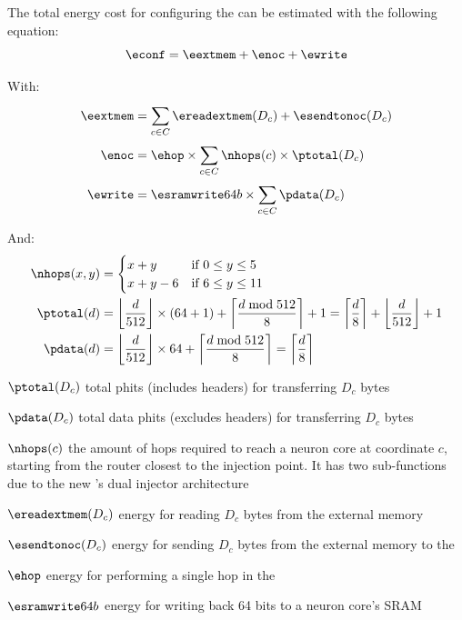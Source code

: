 The total energy cost for configuring the \graicore{} can be estimated with the following equation:
\begin{equation}
    \econf = \eextmem + \enoc + \ewrite
\end{equation}

With:
\begin{align*} 
\eextmem &= 
        \sum_{c \in C}^{}{\ereadextmem(D_c) + \esendtonoc(D_c)} \\
\enoc &=
    \ehop \times \sum_{c \in C}^{}{\nhops(c) \times \ptotal(D_c)} \\
\ewrite &=
    \esramwrite64b \times \sum_{c \in C}^{}{\pdata(D_c)}
\end{align*}

And:
\begin{align*} 
\nhops(x,y) &=
    \begin{cases} 
        x + y & \textrm{if } 0 \leq y \leq 5 \\
        x + y - 6 & \text{if } 6 \leq y \leq 11
    \end{cases}
\\
\ptotal(d) &=
    \left\lfloor \frac{d}{512} \right\rfloor \times (64 + 1) + \left\lceil \frac{d \bmod 512}{8} \right\rceil + 1 =
    \left\lceil \frac{d}{8} \right\rceil + \left\lfloor \frac{d}{512} \right\rfloor + 1 
\\
\pdata(d) &=
    \left\lfloor \frac{d}{512} \right\rfloor \times 64 + \left\lceil \frac{d \bmod 512}{8} \right\rceil =
    \left\lceil \frac{d}{8} \right\rceil
\end{align*}

\begin{eqexpl}[15mm]
    \item{$\ptotal(D_c)$} total phits (includes headers) for transferring $D_c$ bytes
    \item{$\pdata(D_c)$} total data phits (excludes headers) for transferring $D_c$ bytes
    \item{$\nhops(c)$} the amount of hops required to reach a neuron core at coordinate $c$, starting from the router closest to the injection point. It has two sub-functions due to the new \confignoc{}'s dual injector architecture
    \item{$\ereadextmem(D_c)$} energy for reading $D_c$ bytes from the external memory
    \item{$\esendtonoc(D_c)$} energy for sending $D_c$ bytes from the external memory to the \confignoc{}
    \item{$\ehop$} energy for performing a single hop in the \confignoc{}
    \item{$\esramwrite64b$} energy for writing back 64 bits to a neuron core's SRAM
\end{eqexpl}

